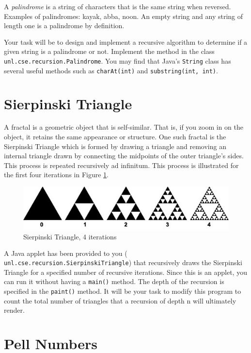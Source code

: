 \documentclass[12pt]{scrartcl}
\begin{document}
A \emph{palindrome} is a string of characters that is the same 
string when reversed.  Examples of palindromes: kayak, abba, 
noon.  An empty string and any string of length one is a palindrome 
by definition.  

Your task will be to design and implement a recursive algorithm to 
determine if a given string is a palindrome or not.  Implement the 
method in the class \texttt{unl.cse.recursion.Palindrome}.
You may find that Java's \texttt{String} class has several 
useful methods such as \texttt{charAt(int)} and 
\texttt{substring(int, int)}.

\section*{Sierpinski Triangle}

A fractal is a geometric object that is self-similar.  That is, 
if you zoom in on the object, it retains the same appearance or 
structure.  One such fractal is the Sierpinski Triangle which is 
formed by drawing a triangle and removing an internal triangle 
drawn by connecting the midpoints of the outer triangle's sides.  
This process is repeated recursively ad infinitum.  This process is illustrated for the first four iterations in Figure \ref{figure:sierpinski}.

\begin{figure}
\centering
\includegraphics[scale=0.75]{sierpinski}
\caption{Sierpinski Triangle, 4 iterations}
\label{figure:sierpinski}
\end{figure}
 
A Java applet has been provided to you (
\texttt{unl.cse.recursion.SierpinskiTriangle}) that 
recursively draws the Sierpinski Triangle for a specified number 
of recursive iterations.  Since this is an applet, you can run it 
without having a \texttt{main()} method.  The depth of 
the recursion is specified in the \texttt{paint()} 
method.  It will be your task to modify this program to count 
the total number of triangles that a recursion of depth n will 
ultimately render.

\section*{Pell Numbers}
\end{document}

